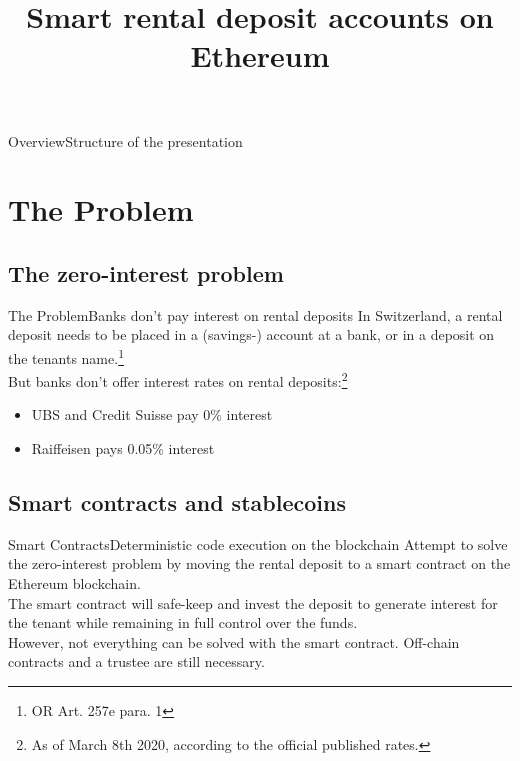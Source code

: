 \documentclass{beamer}
\title{Smart rental deposit accounts on Ethereum}
\begin{document}
  \begin{frame}[plain]
    \titlepage
  \end{frame}
  
\begin{frame}{Overview}{Structure of the presentation}
  \tableofcontents[hideallsubsections]
\end{frame}

\section{The Problem}
\label{sec:introduction}

\subsection{The zero-interest problem}

\begin{frame}{The Problem}{Banks don't pay interest on rental deposits}
	In Switzerland, a rental deposit needs to be placed in a (savings-) account at a bank, or in a deposit on the tenants name.\footnote{OR Art. 257e para. 1}\pause \\
	\vspace{1em}
	But banks don't offer interest rates on rental deposits:\footnote<2->{As of March 8th 2020, according to the official published rates.} 
  \begin{itemize}
    \item<2->UBS and Credit Suisse pay 0\% interest
   	\item Raiffeisen pays 0.05\% interest
  \end{itemize}
  \vspace{1em}

\end{frame}

\subsection{Smart contracts and stablecoins}

\begin{frame}{Smart Contracts}{Deterministic code execution on the blockchain}
	Attempt to solve the zero-interest problem by moving the rental deposit to a smart contract on the Ethereum blockchain. \pause \\ 
	\vspace{1em}
	The smart contract will safe-keep and invest the deposit to generate interest for the tenant while remaining in full control over the funds.
	\pause \\ 
	\vspace{1em}
	However, not everything can be solved with the smart contract. Off-chain contracts and a trustee are still necessary.
\end{frame}
\end{document}
